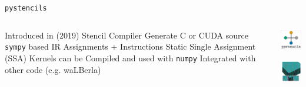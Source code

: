 \begin{frame}{\lstinline{pystencils}}
\begin{columns}
  \begin{outline}
  \1 Introduced in \cite{Bauer2019} (2019)
  \1 Stencil Compiler 
  \2 Generate C or CUDA source
  \2 \lstinline{sympy} based IR
  \2 Assignments + Instructions
  \2 Static Single Assignment (SSA)
  \1 Kernels can be
  \2 Compiled and used with \lstinline{numpy}
  \2 Integrated with other code (e.g. waLBerla)
  \end{outline}

  \centering
  \begin{center}
    \includegraphics[width=2cm]{pystencils_logo.png}

    \vspace{1cm}

    \includegraphics[width=3cm]{phase_field.png}
  \end{center}
\end{columns}
\end{frame}
